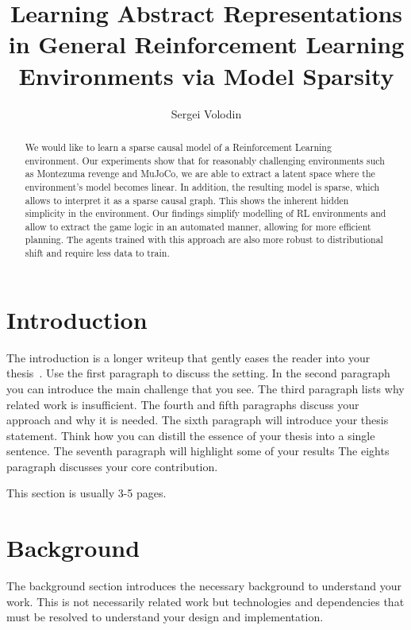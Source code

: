 \documentclass[a4paper,11pt,oneside]{report}
\title{Learning Abstract Representations in General Reinforcement Learning Environments via Model Sparsity}
\author{Sergei Volodin}
\begin{document}
    \maketitle
    \makededication
    \makeacks

\begin{abstract}
We would like to learn a sparse causal model of a Reinforcement Learning environment. Our experiments show that for reasonably challenging environments such as Montezuma revenge and MuJoCo, we are able to extract a latent space where the environment's model becomes linear. In addition, the resulting model is sparse, which allows to interpret it as a sparse causal graph. This shows the inherent hidden simplicity in the environment. Our findings simplify modelling of RL environments and allow to extract the game logic in an automated manner, allowing for more efficient planning. The agents trained with this approach are also more robust to distributional shift and require less data to train.
\end{abstract}

\maketoc

\chapter{Introduction}

The introduction is a longer writeup that gently eases the reader into your
thesis~\cite{dinesh20oakland}. Use the first paragraph to discuss the setting.
In the second paragraph you can introduce the main challenge that you see.
The third paragraph lists why related work is insufficient.
The fourth and fifth paragraphs discuss your approach and why it is needed.
The sixth paragraph will introduce your thesis statement. Think how you can
distill the essence of your thesis into a single sentence.
The seventh paragraph will highlight some of your results
The eights paragraph discusses your core contribution.

This section is usually 3-5 pages.

\chapter{Background}

The background section introduces the necessary background to understand your
work. This is not necessarily related work but technologies and dependencies
that must be resolved to understand your design and implementation.
\end{document}
